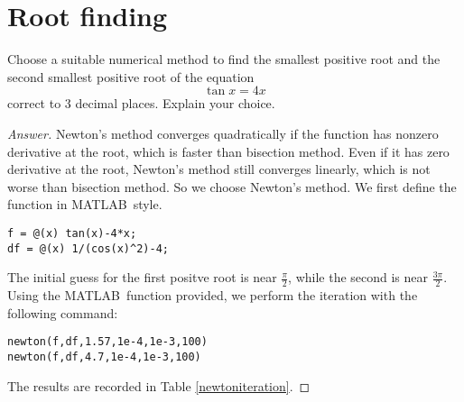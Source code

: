 \section{Root finding}
Choose a suitable numerical method to find the smallest positive root and the second smallest positive root of the equation
\[ \tan x = 4x \]
correct to 3 decimal places.
Explain your choice.
\begin{proof}[Answer]
Newton's method converges quadratically if the function has nonzero derivative at the root, which is faster than bisection method.
Even if it has zero derivative at the root, Newton's method still converges linearly, which is not worse than bisection method.
So we choose Newton's method.
We first define the function in MATLAB\texttrademark\ style.
\begin{lstlisting}[style=Matlab-editor]
f = @(x) tan(x)-4*x;
df = @(x) 1/(cos(x)^2)-4;
\end{lstlisting}
The initial guess for the first positve root is near \(\frac{\pi}{2}\), while the second is near \(\frac{3\pi}{2}\).
Using the MATLAB\texttrademark\ function provided, we perform the iteration with the following command:
\begin{lstlisting}[style=Matlab-editor]
newton(f,df,1.57,1e-4,1e-3,100)
newton(f,df,4.7,1e-4,1e-3,100)
\end{lstlisting}
The results are recorded in Table \ref{newtoniteration}.
\begin{table}[htbp]
\centering
\end{table}
\end{proof}
